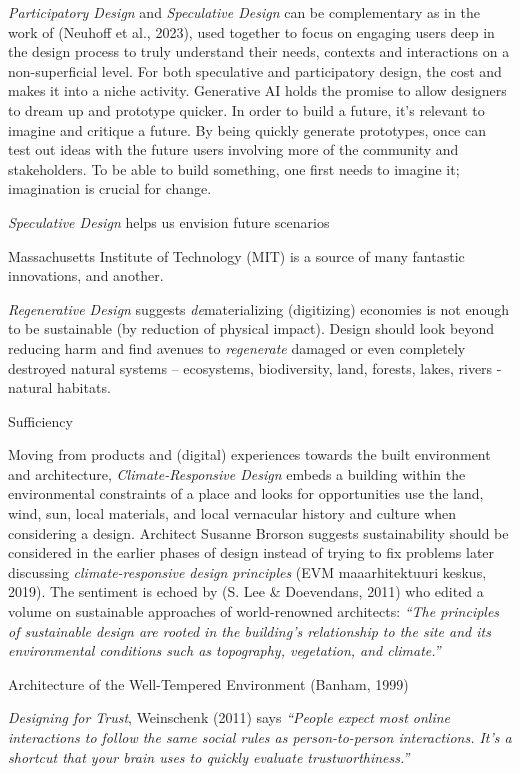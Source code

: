 \documentclass[
  letterpaper,
  DIV=11,
  numbers=noendperiod]{scrartcl}
\begin{document}
\emph{Participatory Design} and \emph{Speculative Design} can be
complementary as in the work of (Neuhoff et al., 2023), used together to
focus on engaging users deep in the design process to truly understand
their needs, contexts and interactions on a non-superficial level. For
both speculative and participatory design, the cost and makes it into a
niche activity. Generative AI holds the promise to allow designers to
dream up and prototype quicker. In order to build a future, it's
relevant to imagine and critique a future. By being quickly generate
prototypes, once can test out ideas with the future users involving more
of the community and stakeholders. To be able to build something, one
first needs to imagine it; imagination is crucial for change.

\emph{Speculative Design} helps us envision future scenarios

Massachusetts Institute of Technology (MIT) is a source of many
fantastic innovations, and another.

\emph{Regenerative Design} suggests \emph{de}materializing (digitizing)
economies is not enough to be sustainable (by reduction of physical
impact). Design should look beyond reducing harm and find avenues to
\emph{regenerate} damaged or even completely destroyed natural systems
-- ecosystems, biodiversity, land, forests, lakes, rivers - natural
habitats.

Sufficiency

Moving from products and (digital) experiences towards the built
environment and architecture, \emph{Climate-Responsive Design} embeds a
building within the environmental constraints of a place and looks for
opportunities use the land, wind, sun, local materials, and local
vernacular history and culture when considering a design. Architect
Susanne Brorson suggests sustainability should be considered in the
earlier phases of design instead of trying to fix problems later
discussing \emph{climate-responsive design principles} (EVM
maaarhitektuuri keskus, 2019). The sentiment is echoed by (S. Lee \&
Doevendans, 2011) who edited a volume on sustainable approaches of
world-renowned architects: \emph{``The principles of sustainable design
are rooted in the building's relationship to the site and its
environmental conditions such as topography, vegetation, and climate.''}

Architecture of the Well-Tempered Environment (Banham, 1999)

\emph{Designing for Trust}, Weinschenk (2011) says \emph{``People expect
most online interactions to follow the same social rules as
person-to-person interactions. It's a shortcut that your brain uses to
quickly evaluate trustworthiness.''}
\end{document}
